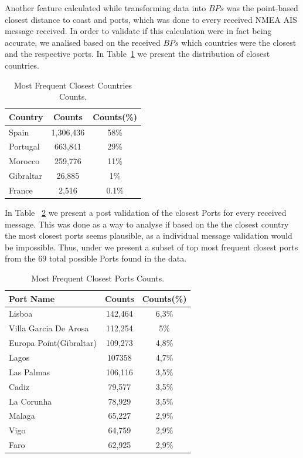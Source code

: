 Another feature calculated while transforming data into $BPs$ was the point-based closest distance to coast and ports, which was done to every received NMEA AIS message received. In order to validate if this calculation were in fact being accurate, we analised based on the received $BPs$ which countries were the closest and the respective ports.
In Table~\ref{Table: 5 Closest Countries} we present the distribution of closest countries. 
\begin{table}[H]
\centering
\caption{Most Frequent Closest Countries Counts.}
\label{Table: 5 Closest Countries}
\begin{tabular}{@{}lcc@{}}
\toprule
Country & Counts & Counts(\%) \\ \midrule
Spain & 1,306,436 & 58\% \\
Portugal & 663,841 & 29\% \\
Morocco & 259,776 & 11\% \\
Gibraltar & 26,885 & 1\% \\
France & 2,516 & 0.1\% \\ \bottomrule
\end{tabular}
\end{table}
In Table ~\ref{Table: 5 Closest Ports} we present a post validation of the closest Ports for every received message. This was done as a way to analyse if based on the the closest country the most closest ports seems plausible, as a individual message validation would be impossible. Thus, under we present a subset of top most frequent closest ports from the $69$ total possible Ports found in the data.
\begin{table}[H]
\centering
\caption{Most Frequent Closest Ports Counts.}
\label{Table: 5 Closest Ports}
\begin{tabular}{@{}lcc@{}}
\toprule
Port Name & Counts & Counts(\%) \\ \midrule
Lisboa & 142,464 & 6,3\% \\
Villa Garcia De Arosa & 112,254 & 5\% \\
Europa Point(Gibraltar) & 109,273 & 4,8\% \\
Lagos & 107358 & 4,7\% \\
Las Palmas & 106,116 & 3,5\% \\
Cadiz & 79,577 & 3,5\% \\
La Corunha & 78,929 & 3,5\% \\
Malaga & 65,227 & 2,9\% \\
Vigo & 64,759 & 2,9\% \\
Faro & 62,925 & 2,9\% \\ \bottomrule
\end{tabular}
\end{table}

